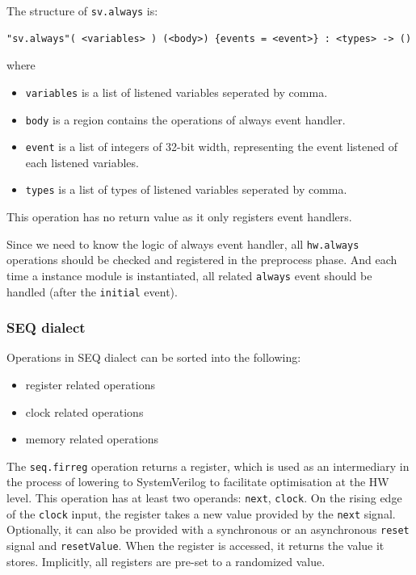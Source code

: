 The structure of \verb|sv.always| is:
\begin{lstlisting}
"sv.always"( <variables> ) (<body>) {events = <event>} : <types> -> ()
\end{lstlisting}
where
\begin{itemize}
    \item \verb|variables| is a list of listened variables seperated by comma.
    \item \verb|body| is a region contains the operations of always event handler.
    \item \verb|event| is a list of integers of 32-bit width, representing the event listened of each listened variables.
    \item \verb|types| is a list of types of listened variables seperated by comma.
\end{itemize}
This operation has no return value as it only registers event handlers.

Since we need to know the logic of always event handler, all \verb|hw.always| operations should be checked and registered in the preprocess phase. And each time a instance module is instantiated, all related \verb|always| event should be handled (after the \verb|initial| event).

\subsubsection{SEQ dialect}

Operations in SEQ dialect can be sorted into the following:
\begin{itemize}
    \item register related operations
    \item clock related operations
    \item memory related operations
\end{itemize}

The \verb|seq.firreg| operation returns a register, which is used as an intermediary in the process of lowering to SystemVerilog to facilitate optimisation at the HW level. This operation has at least two operands: \verb|next|, \verb|clock|. On the rising edge of the \verb|clock| input, the register takes a new value provided by the \verb|next| signal. Optionally, it can also be provided with a synchronous or an asynchronous \verb|reset| signal and \verb|resetValue|. When the register is accessed, it returns the value it stores. Implicitly, all registers are pre-set to a randomized value.

